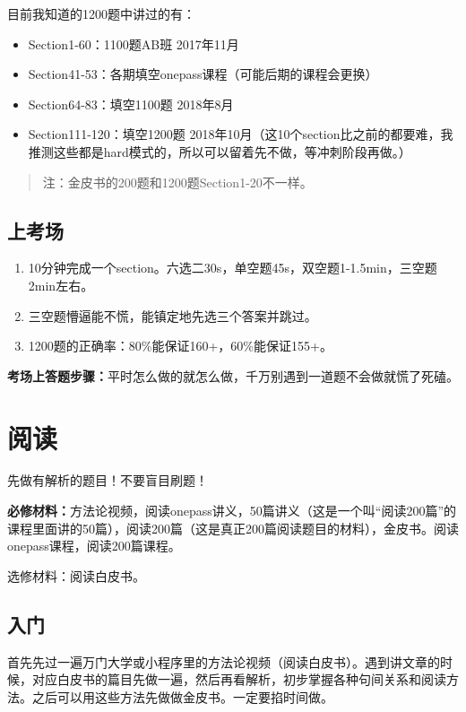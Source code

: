 \documentclass[cn,plain]{elegantbookex}
\newenvironment{material}{\begin{tcolorbox}[title={材料}]}{\end{tcolorbox}}
\begin{document}
目前我知道的1200题中讲过的有：
\begin{itemize}
    \item Section1-60：1100题AB班 2017年11月
    \item Section41-53：各期填空onepass课程（可能后期的课程会更换）
    \item Section64-83：填空1100题 2018年8月
    \item Section111-120：填空1200题 2018年10月（这10个section比之前的都要难，我推测这些都是hard模式的，所以可以留着先不做，等冲刺阶段再做。）
\end{itemize}

\begin{quote}
注：金皮书的200题和1200题Section1-20不一样。
\end{quote}

\subsection{上考场}
\begin{enumerate}
    \item 10分钟完成一个section。六选二30s，单空题45s，双空题1-1.5min，三空题
2min左右。
    \item 三空题懵逼能不慌，能镇定地先选三个答案并跳过。
    \item 1200题的正确率：80\%能保证160+，60\%能保证155+。
\end{enumerate}

\textbf{考场上答题步骤：}平时怎么做的就怎么做，千万别遇到一道题不会做就慌了死磕。

\section{阅读}
先做有解析的题目！不要盲目刷题！

\begin{material}
\textbf{必修材料：}方法论视频，阅读onepass讲义，50篇讲义（这是一个叫``阅读200篇''的课程里面讲的50篇），阅读200篇（这是真正200篇阅读题目的材料），金皮书。阅读onepass课程，阅读200篇课程。

选修材料：阅读白皮书。
\end{material}

\subsection{入门}
首先先过一遍万门大学或小程序里的方法论视频（阅读白皮书）。遇到讲文章的时候，对应白皮书的篇目先做一遍，然后再看解析，初步掌握各种句间关系和阅读方法。之后可以用这些方法先做做金皮书。一定要掐时间做。
\end{document}
